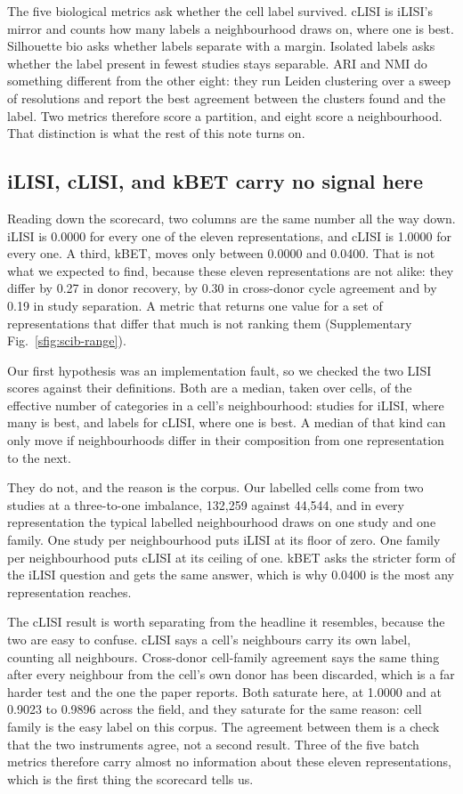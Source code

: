 The five biological metrics ask whether the cell label survived. cLISI is
iLISI's mirror and counts how many labels a neighbourhood draws on, where
one is best. Silhouette bio asks whether labels separate with a margin.
Isolated labels asks whether the label present in fewest studies stays
separable. ARI \citep{hubert1985comparing} and NMI do something different from the other eight: they
run Leiden clustering \citep{traag2019louvain} over a sweep of resolutions and report the best
agreement between the clusters found and the label. Two metrics therefore
score a partition, and eight score a neighbourhood. That distinction is
what the rest of this note turns on.

\subsection{iLISI, cLISI, and kBET carry no signal here}

Reading down the scorecard, two columns are the same number all the way
down. iLISI is 0.0000 for every one of the eleven representations, and
cLISI is 1.0000 for every one. A third, kBET, moves only between 0.0000
and 0.0400. That is not what we expected to find, because these eleven
representations are not alike: they differ by 0.27 in donor recovery, by
0.30 in cross-donor cycle agreement and by 0.19 in study separation. A
metric that returns one value for a set of representations that differ
that much is not ranking them (Supplementary Fig.~\ref{sfig:scib-range}).

Our first hypothesis was an implementation fault, so we checked the two
LISI scores against their definitions. Both are a median, taken over
cells, of the effective number of categories in a cell's neighbourhood:
studies for iLISI, where many is best, and labels for cLISI, where one is
best. A median of that kind can only move if neighbourhoods differ in
their composition from one representation to the next.

They do not, and the reason is the corpus. Our
labelled cells come from two studies at a three-to-one imbalance,
132{,}259 against 44{,}544, and in every representation the typical
labelled neighbourhood draws on one study and one family. One study per
neighbourhood puts iLISI at its floor of zero. One family per
neighbourhood puts cLISI at its ceiling of one. kBET asks the stricter
form of the iLISI question and gets the same answer, which is why 0.0400
is the most any representation reaches.

The cLISI result is worth separating from the headline it resembles,
because the two are easy to confuse. cLISI says a cell's neighbours carry
its own label, counting all neighbours. Cross-donor cell-family agreement
says the same thing after every neighbour from the cell's own donor has
been discarded, which is a far harder test and the one the paper reports.
Both saturate here, at 1.0000 and at 0.9023 to 0.9896 across the field,
and they saturate for the same reason: cell family is the easy label on
this corpus. The agreement between them is a check that the two
instruments agree, not a second result. Three of the five batch metrics
therefore carry almost no information about these eleven representations,
which is the first thing the scorecard tells us.

